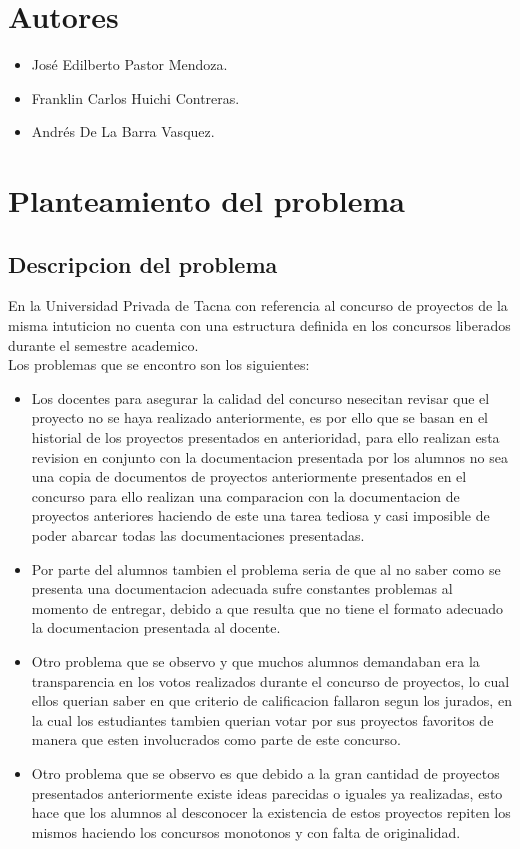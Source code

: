 \documentclass[%
 reprint,
 amsmath,amssymb,
 aps,
]{revtex4-1}
\begin{document}
\section{Autores}
\begin{itemize}
\item José Edilberto Pastor Mendoza.
\item Franklin Carlos  Huichi Contreras.
\item Andrés De La Barra Vasquez.
\end{itemize}

\section{Planteamiento del problema}
\subsection{Descripcion del problema}
En la Universidad Privada de Tacna con referencia al concurso de proyectos de la misma intuticion no cuenta con una estructura definida en los concursos liberados durante el semestre academico. \\
Los problemas que se encontro son los siguientes:
\begin{itemize}
\item Los docentes para asegurar la calidad del concurso nesecitan revisar que el proyecto no se haya realizado anteriormente, es por ello que se basan en el historial de los proyectos presentados en anterioridad, para ello realizan esta revision en conjunto con la documentacion presentada por los alumnos no sea una copia de documentos de proyectos anteriormente presentados en el concurso para ello realizan una comparacion con la documentacion de proyectos anteriores haciendo de este una tarea tediosa y casi imposible de poder abarcar todas las documentaciones presentadas.
\item  Por parte del alumnos tambien el problema seria de que al no saber como se presenta  una documentacion adecuada sufre constantes problemas al momento de entregar, debido a que resulta que no tiene el formato adecuado la documentacion presentada al docente. 
\item Otro problema que se observo y que muchos alumnos demandaban era la transparencia en los votos realizados durante el concurso de proyectos, lo cual ellos querian saber en que criterio de calificacion fallaron segun los jurados, en la cual los estudiantes tambien querian votar por sus proyectos favoritos de manera que esten involucrados como parte de este concurso.
\item Otro problema que se observo es que debido a la gran cantidad de proyectos presentados anteriormente existe ideas parecidas o iguales ya realizadas, esto hace que los alumnos al desconocer la existencia de estos proyectos repiten los mismos haciendo los concursos monotonos y con falta de originalidad.
\end{itemize}
\end{document}
